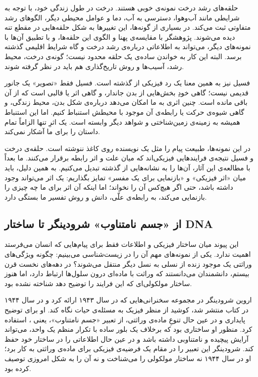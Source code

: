حلقه‌های رشد درخت نمونه‌ی خوبی هستند. درخت در طول زندگی خود، با توجه به شرایطی مانند آب‌وهوا، دسترسی به آب، دما و عوامل محیطی دیگر، الگوهای رشد متفاوتی ثبت می‌کند. در بسیاری از گونه‌ها، این تغییرها به شکل حلقه‌هایی در مقطع تنه دیده می‌شوند. پژوهشگر با مقایسه‌ی پهنا و الگوی این حلقه‌ها، و با تطبیق آن‌ها با نمونه‌های دیگر، می‌تواند به اطلاعاتی درباره‌ی رشد درخت و گاه شرایط اقلیمی گذشته برسد. البته این کار به خواندن ساده‌ی یک حلقه محدود نیست؛ گونه‌ی درخت، محیط رشد، آسیب‌ها و روش تاریخ‌گذاری هم باید در نظر گرفته شوند. \autocite{speer2010,stgeorge2022treerings}

فسیل نیز به همین معنا یک رد فیزیکی از گذشته است. فسیل فقط «تصویر» یک جانور قدیمی نیست؛ گاهی خودِ بخش‌هایی از بدن جاندار، و گاهی اثر یا قالبی است که از آن باقی مانده است. چنین اثری به ما امکان می‌دهد درباره‌ی شکل بدن، محیط زندگی، و گاهی شیوه‌ی حرکت یا رابطه‌ی آن موجود با محیطش استنباط کنیم. اما این استنباط همیشه به زمینه‌ی زمین‌شناختی و شواهد دیگر وابسته است. یک اثرِ تنها الزاماً تمام داستان را برای ما آشکار نمی‌کند. \autocite{nps-fossils}

در این نمونه‌ها، طبیعت پیام را مثل یک نویسنده روی کاغذ ننوشته است. حلقه‌ی درخت و فسیل نتیجه‌ی فرایندهایی فیزیکی‌اند که میان علت و اثر رابطه برقرار می‌کنند. ما بعداً با مطالعه‌ی این آثار، آن‌ها را به نشانه‌هایی از گذشته تبدیل می‌کنیم. به همین دلیل، باید میان «اثر فیزیکی» و «بازنمایی برای یک مفسر» تمایز بگذاریم: یک اثر می‌تواند وجود داشته باشد، حتی اگر هیچ‌کس آن را نخواند؛ اما اینکه آن اثر برای ما چه چیزی را بازنمایی می‌کند، به رابطه‌ی علّی، دانش و روش تفسیر ما بستگی دارد.

\subsection{از «جسم نامتناوب» شرودینگر تا ساختار DNA}
\label{sub:schrodinger-dna}

این پیوند میان ساختار فیزیکی و اطلاعات فقط برای پیام‌هایی که انسان می‌فرستد اهمیت ندارد. یکی از نمونه‌های مهم آن را در زیست‌شناسی می‌بینیم: چگونه ویژگی‌های وراثتی یک موجود زنده از نسلی به نسل دیگر منتقل می‌شوند؟ در دهه‌های نخست قرن بیستم، دانشمندان می‌دانستند که وراثت با ماده‌ای درون سلول‌ها ارتباط دارد، اما هنوز ساختار مولکولی‌ای که این فرایند را توضیح دهد شناخته نشده بود.

اروین شرودینگر در مجموعه سخنرانی‌هایی که در سال ۱۹۴۳ ارائه کرد و در سال ۱۹۴۴ در کتاب \textit{} منتشر شد، کوشید از منظر فیزیک به مسئله‌ی حیات نگاه کند. او برای توضیح پایداری و در عین حال تنوعِ ماده‌ی وراثتی، از تعبیر «جسم نامتناوب»، یعنی ، استفاده کرد. منظور او ساختاری بود که برخلاف یک بلور ساده با تکرار منظم یک واحد، می‌تواند آرایش پیچیده و نامتناوبی داشته باشد و در عین حال اطلاعاتی را در ساختار خود حفظ کند. شرودینگر این تعبیر را در مقام یک فرضیه‌ی فیزیکی برای ماده‌ی وراثتی به کار برد؛ او در سال ۱۹۴۴ نه ساختار مولکولی  را می‌شناخت و نه آن را به شکل امروزی توصیف کرده بود. \autocite{schrodinger1944}

